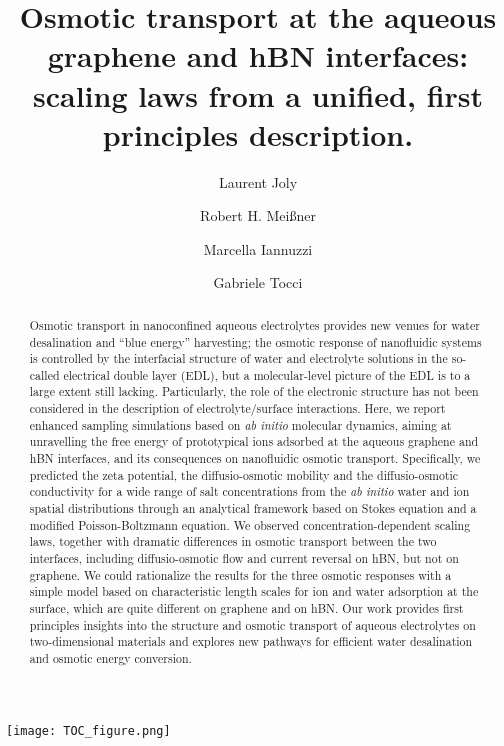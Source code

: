 \documentclass[journal=ancac3,manuscript=article,layout=twocolumn]{achemso}
\author{Laurent Joly}
\affiliation[Universit\'e Lyon 1]{\ilm}
\author{Robert H. Mei{\ss}ner}
\affiliation[Hamburg University of Technology]{\tuhh}
\author{Marcella Iannuzzi}
\affiliation[Universit\"at Z\"urich]{\uzh}
\author{Gabriele Tocci}
\affiliation[Universit\"at Z\"urich]{\uzh}
\title{Osmotic transport at the aqueous graphene and hBN interfaces: scaling laws from a unified, first principles description.
}
\begin{document}
\begin{tocentry}
\texttt{[image: TOC\_figure.png]}
\end{tocentry}
%

\begin{abstract}
Osmotic transport in nanoconfined aqueous electrolytes provides new venues for water desalination and ``blue energy'' harvesting; the osmotic response of nanofluidic systems is controlled by the interfacial structure of water and electrolyte solutions in the so-called electrical double layer (EDL), but
a molecular-level picture
of the EDL is to
a large extent still lacking.
Particularly, the role of the electronic
structure has not been considered
in the description of electrolyte/surface
interactions.
Here, we report enhanced sampling simulations
based on \textit{ab initio} molecular dynamics,
aiming at unravelling the free energy of prototypical
ions adsorbed at the aqueous graphene and hBN interfaces,
and  its consequences on nanofluidic osmotic transport.
Specifically, we predicted the zeta potential, the diffusio-osmotic
mobility and the diffusio-osmotic conductivity
for a wide range of salt
concentrations from the \textit{ab initio}
water and ion spatial distributions through an analytical
framework based on Stokes equation and a
modified Poisson-Boltzmann equation.
We observed concentration-dependent scaling laws,
together with
dramatic differences in osmotic transport
between the two interfaces, including
diffusio-osmotic flow and current
reversal on hBN,
but not on graphene.
We could rationalize the results for the three osmotic responses with a simple model based on characteristic length scales for ion and water adsorption at the surface, which are quite different on graphene and on hBN.
Our work provides first principles insights into the
structure and osmotic transport of aqueous electrolytes
on two-dimensional materials and
explores new pathways for efficient water
desalination and osmotic energy conversion.
\end{abstract}
\end{document}
